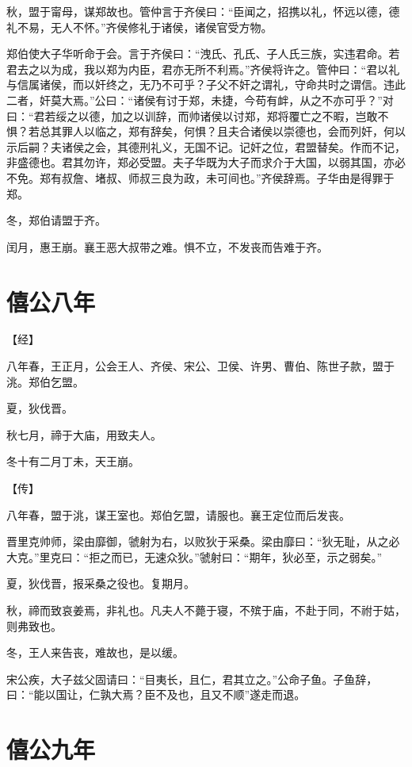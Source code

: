 \documentclass[a4paper,12pt,UTF8,twoside]{ctexbook}
\begin{document}
秋，盟于甯母，谋郑故也。管仲言于齐侯曰：“臣闻之，招携以礼，怀远以德，德礼不易，无人不怀。”齐侯修礼于诸侯，诸侯官受方物。

郑伯使大子华听命于会。言于齐侯曰：“洩氏、孔氏、子人氏三族，实违君命。若君去之以为成，我以郑为内臣，君亦无所不利焉。”齐侯将许之。管仲曰：“君以礼与信属诸侯，而以奸终之，无乃不可乎？子父不奸之谓礼，守命共时之谓信。违此二者，奸莫大焉。”公曰：“诸侯有讨于郑，未捷，今苟有衅，从之不亦可乎？”对曰：“君若绥之以德，加之以训辞，而帅诸侯以讨郑，郑将覆亡之不暇，岂敢不惧？若总其罪人以临之，郑有辞矣，何惧？且夫合诸侯以崇德也，会而列奸，何以示后嗣？夫诸侯之会，其德刑礼义，无国不记。记奸之位，君盟替矣。作而不记，非盛德也。君其勿许，郑必受盟。夫子华既为大子而求介于大国，以弱其国，亦必不免。郑有叔詹、堵叔、师叔三良为政，未可间也。”齐侯辞焉。子华由是得罪于郑。

冬，郑伯请盟于齐。

闰月，惠王崩。襄王恶大叔带之难。惧不立，不发丧而告难于齐。

\chapter{僖公八年}


【经】

八年春，王正月，公会王人、齐侯、宋公、卫侯、许男、曹伯、陈世子款，盟于洮。郑伯乞盟。

夏，狄伐晋。

秋七月，禘于大庙，用致夫人。

冬十有二月丁未，天王崩。

【传】

八年春，盟于洮，谋王室也。郑伯乞盟，请服也。襄王定位而后发丧。

晋里克帅师，梁由靡御，虢射为右，以败狄于采桑。梁由靡曰：“狄无耻，从之必大克。”里克曰：“拒之而已，无速众狄。”虢射曰：“期年，狄必至，示之弱矣。”

夏，狄伐晋，报采桑之役也。复期月。

秋，禘而致哀姜焉，非礼也。凡夫人不薨于寝，不殡于庙，不赴于同，不祔于姑，则弗致也。

冬，王人来告丧，难故也，是以缓。

宋公疾，大子兹父固请曰：“目夷长，且仁，君其立之。”公命子鱼。子鱼辞，曰：“能以国让，仁孰大焉？臣不及也，且又不顺”遂走而退。

\chapter{僖公九年}
\end{document}

